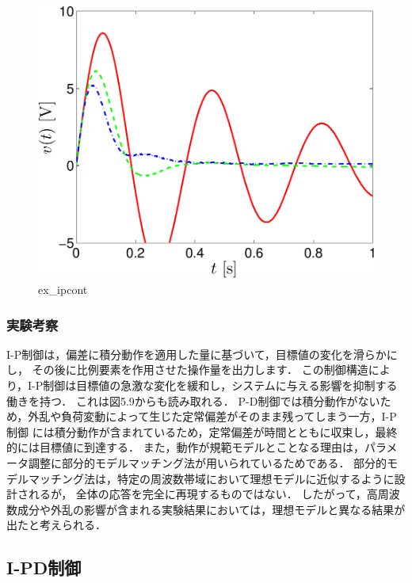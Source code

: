 \begin{figure}[h]
  \centering
  \includegraphics[scale=0.5]{sozai/figure_ipcont_volt-crop.pdf}
  \caption{ex\_ipcont}
\end{figure}

\subsubsection{実験考察}
I-P制御は，偏差に積分動作を適用した量に基づいて，目標値の変化を滑らかにし，
その後に比例要素を作用させた操作量を出力します．
この制御構造により，I-P制御は目標値の急激な変化を緩和し，システムに与える影響を抑制する働きを持つ．
これは図5.9からも読み取れる．
P-D制御では積分動作がないため，外乱や負荷変動によって生じた定常偏差がそのまま残ってしまう一方，I-P制御
には積分動作が含まれているため，定常偏差が時間とともに収束し，最終的には目標値に到達する．
また，動作が規範モデルとことなる理由は，パラメータ調整に部分的モデルマッチング法が用いられているためである．
部分的モデルマッチング法は，特定の周波数帯域において理想モデルに近似するように設計されるが，
全体の応答を完全に再現するものではない．
したがって，高周波数成分や外乱の影響が含まれる実験結果においては，理想モデルと異なる結果が出たと考えられる．

\subsection{I-PD制御}

